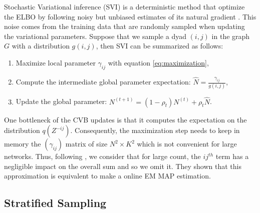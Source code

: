 Stochastic Variational inference (SVI) is a deterministic method that optimize the ELBO by following noisy but unbiased estimates of its natural gradient \cite{hoffman2013stochastic}. This noise comes from the training data that are randomly sampled when updating the variational parameters. Suppose  that we sample a dyad $(i,j)$ in the graph $G$ with a distribution $g(i,j)$, then SVI can be summarized as follows:
\begin{enumerate}
\item Maximize local parameter $\gamma_{ij}$ with equation \eqref{eq:maximization},
\item Compute the intermediate global parameter expectation: $\hat N = \frac{\gamma_{ij}}{g(i,j)}$,
\item Update the global parameter: $N^{(t+1)} = (1-\rho_t)N^{(t)} + \rho_t \hat N$.
\end{enumerate}

One bottleneck of the CVB updates is that it computes the expectation on the distribution $q(Z^{-ij})$. Consequently, the maximization step needs to keep in memory the $(\gamma_{ij})$ matrix of size $N^2\times K^2$ which is not convenient for large networks. Thus, following \cite{foulds2013stochastic}, we consider that for large count, the $ij^{th}$ term has a negligible impact on the overall sum and so we omit it. They shown that this approximation is equivalent to make a online EM MAP estimation.

\subsection{Stratified Sampling}
\label{sec:sampling}

